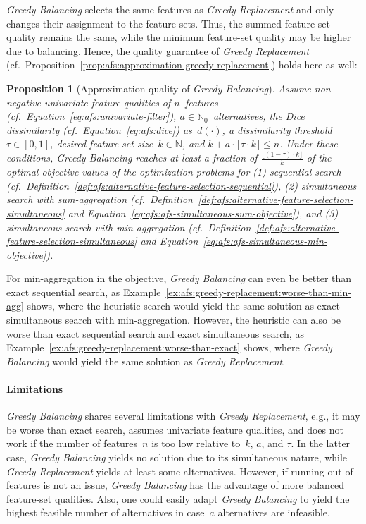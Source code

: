 \documentclass{article}
\newtheorem{proposition}{Proposition}
\theoremstyle{definition}
\begin{document}
\emph{Greedy Balancing} selects the same features as \emph{Greedy Replacement} and only changes their assignment to the feature sets.
Thus, the summed feature-set quality remains the same, while the minimum feature-set quality may be higher due to balancing.
Hence, the quality guarantee of \emph{Greedy Replacement} (cf.~Proposition~\ref{prop:afs:approximation-greedy-replacement}) holds here as well:
%
\begin{proposition}[Approximation quality of \emph{Greedy Balancing}]
	Assume non-negative univariate feature qualities of $n$~features (cf.~Equation~\ref{eq:afs:univariate-filter}), $a \in \mathbb{N}_0$~alternatives, the Dice dissimilarity (cf.~Equation~\ref{eq:afs:dice}) as~$d(\cdot)$, a dissimilarity threshold~$\tau \in [0,1]$, desired feature-set size~$k \in \mathbb{N}$, and $k + a \cdot \lceil \tau \cdot k \rceil \leq n$.
	Under these conditions, \emph{Greedy Balancing} reaches at least a fraction of $\frac{\lfloor (1 - \tau) \cdot k \rfloor}{k}$ of the optimal objective values of the optimization problems for (1) sequential search (cf.~Definition~\ref{def:afs:alternative-feature-selection-sequential}), (2) simultaneous search with sum-aggregation (cf.~Definition~\ref{def:afs:alternative-feature-selection-simultaneous} and Equation~\ref{eq:afs:afs-simultaneous-sum-objective}), and (3) simultaneous search with min-aggregation (cf.~Definition~\ref{def:afs:alternative-feature-selection-simultaneous} and Equation~\ref{eq:afs:afs-simultaneous-min-objective}).
	\label{prop:afs:approximation-greedy-balancing}
\end{proposition}
%
For min-aggregation in the objective, \emph{Greedy Balancing} can even be better than exact sequential search, as Example~\ref{ex:afs:greedy-replacement:worse-than-min-agg} shows, where the heuristic search would yield the same solution as exact simultaneous search with min-aggregation.
However, the heuristic can also be worse than exact sequential search and exact simultaneous search, as Example~\ref{ex:afs:greedy-replacement:worse-than-exact} shows, where \emph{Greedy Balancing} would yield the same solution as \emph{Greedy Replacement}.

\paragraph{Limitations}

\emph{Greedy Balancing} shares several limitations with \emph{Greedy Replacement}, e.g., it may be worse than exact search, assumes univariate feature qualities, and does not work if the number of features~$n$ is too low relative to~$k$, $a$, and $\tau$.
In the latter case, \emph{Greedy Balancing} yields no solution due to its simultaneous nature, while \emph{Greedy Replacement} yields at least some alternatives.
However, if running out of features is not an issue, \emph{Greedy Balancing} has the advantage of more balanced feature-set qualities.
Also, one could easily adapt \emph{Greedy Balancing} to yield the highest feasible number of alternatives in case~$a$ alternatives are infeasible.
\end{document}
